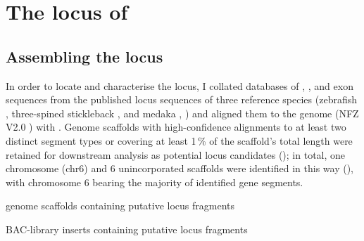 \section{The \igh{} locus of \nfu}
\label{sec:nfu-locus}

\subsection{Assembling the \Nfu \igh{} locus}
\label{sec:nfu-locus-assembly}

In order to locate and characterise the \nfu \igh{} locus, I collated databases of \vh, \jh, and \ch exon sequences from the published locus sequences of three reference species (zebrafish \parencite{danilova2005zebrafish}, three-spined stickleback \parencite{bao2010stickleback,gambondeza2011stickleback}, and medaka \parencite{magadan2011medaka}, ) and aligned them to the \nfu genome (NFZ V2.0 \parencite{willemsen2019popgen}) with  \parencite{altschul1990blast,altschul1997blast}. Genome scaffolds with high-confidence alignments to at least two distinct segment types or covering at least 1\,\% of the scaffold's total length were retained for downstream analysis as potential locus candidates (); in total, one chromosome (chr6) and 6 unincorporated scaffolds were identified in this way (), with chromosome 6 bearing the majority of identified gene segments.

\begin{table}[bh]
\centering
\caption{\Nfu genome scaffolds containing putative \igh{} locus fragments}
\begin{threeparttable}

\end{threeparttable}
\label{tab:nfu-locus-scaffolds}
\end{table}

\begin{table}[bh]
\centering
\caption{\Nfu BAC-library inserts containing putative \igh{} locus fragments}
\begin{threeparttable}

\end{threeparttable}
\label{tab:nfu-locus-bacs}
\end{table}

